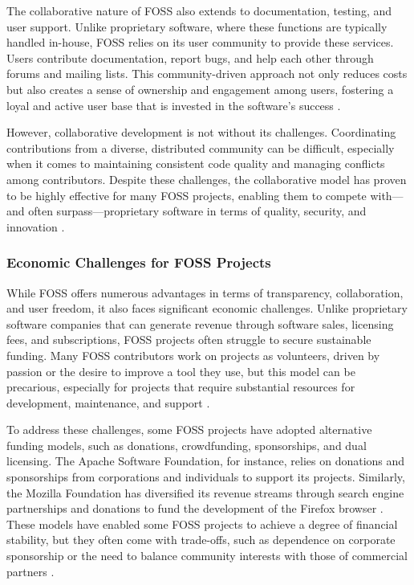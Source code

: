 \begin{refsection}
The collaborative nature of FOSS also extends to documentation, testing, and user support. Unlike proprietary software, where these functions are typically handled in-house, FOSS relies on its user community to provide these services. Users contribute documentation, report bugs, and help each other through forums and mailing lists. This community-driven approach not only reduces costs but also creates a sense of ownership and engagement among users, fostering a loyal and active user base that is invested in the software's success \cite[pp.~78-84]{lerner2000}.

However, collaborative development is not without its challenges. Coordinating contributions from a diverse, distributed community can be difficult, especially when it comes to maintaining consistent code quality and managing conflicts among contributors. Despite these challenges, the collaborative model has proven to be highly effective for many FOSS projects, enabling them to compete with—and often surpass—proprietary software in terms of quality, security, and innovation \cite[pp.~89-95]{benkler2010}.

\subsubsection{Economic Challenges for FOSS Projects}

While FOSS offers numerous advantages in terms of transparency, collaboration, and user freedom, it also faces significant economic challenges. Unlike proprietary software companies that can generate revenue through software sales, licensing fees, and subscriptions, FOSS projects often struggle to secure sustainable funding. Many FOSS contributors work on projects as volunteers, driven by passion or the desire to improve a tool they use, but this model can be precarious, especially for projects that require substantial resources for development, maintenance, and support \cite[pp.~51-55]{vonhippel2006}.

To address these challenges, some FOSS projects have adopted alternative funding models, such as donations, crowdfunding, sponsorships, and dual licensing. The Apache Software Foundation, for instance, relies on donations and sponsorships from corporations and individuals to support its projects. Similarly, the Mozilla Foundation has diversified its revenue streams through search engine partnerships and donations to fund the development of the Firefox browser \cite[pp.~70-75]{moody2002}. These models have enabled some FOSS projects to achieve a degree of financial stability, but they often come with trade-offs, such as dependence on corporate sponsorship or the need to balance community interests with those of commercial partners \cite[pp.~99-103]{lerner2000}.


\end{refsection}
